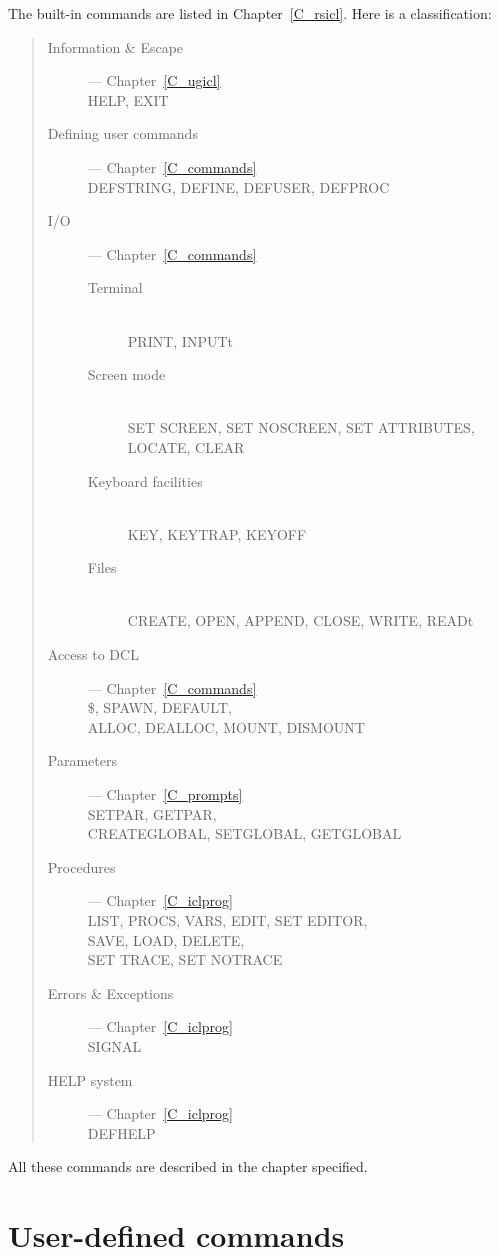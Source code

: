The built-in commands are listed in Chapter~\ref{C_rsicl}.
Here is a classification:
\begin{quote}
\begin{description}
\item [Information \& Escape] --- Chapter~\ref{C_ugicl}\\
HELP, EXIT
\item [Defining user commands] --- Chapter~\ref{C_commands}\\
DEFSTRING, DEFINE, DEFUSER, DEFPROC
\item [I/O] --- Chapter~\ref{C_commands}
\begin{description}
\item [Terminal] \hfill \\
PRINT, INPUTt
\item [Screen mode] \hfill \\
SET SCREEN, SET NOSCREEN, SET ATTRIBUTES, LOCATE, CLEAR
\item [Keyboard facilities] \hfill \\
KEY, KEYTRAP, KEYOFF
\item [Files] \hfill \\
CREATE, OPEN, APPEND, CLOSE, WRITE, READt
\end{description}
\item [Access to DCL] --- Chapter~\ref{C_commands}\\
\$, SPAWN, DEFAULT, \\
ALLOC, DEALLOC, MOUNT, DISMOUNT
\item [Parameters] --- Chapter~\ref{C_prompts}\\
SETPAR, GETPAR, \\
CREATEGLOBAL, SETGLOBAL, GETGLOBAL
\item [Procedures] --- Chapter~\ref{C_iclprog}\\
LIST, PROCS, VARS, EDIT, SET EDITOR, \\
SAVE, LOAD, DELETE, \\
SET TRACE, SET NOTRACE
\item [Errors \& Exceptions] --- Chapter~\ref{C_iclprog}\\
SIGNAL
\item [HELP system] --- Chapter~\ref{C_iclprog}\\
DEFHELP
\end{description}
\end{quote}
All these commands are described in the chapter specified.

\section{User-defined commands}
\label{S_udc}

